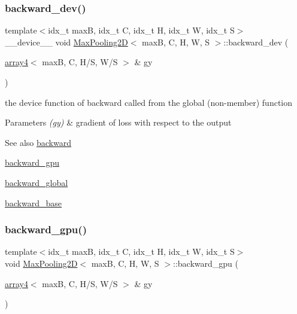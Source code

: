 \subsubsection{\texorpdfstring{backward\+\_\+dev()}{backward\_dev()}}
{\footnotesize\ttfamily template$<$idx\+\_\+t maxB, idx\+\_\+t C, idx\+\_\+t H, idx\+\_\+t W, idx\+\_\+t S$>$ \\
\+\_\+\+\_\+device\+\_\+\+\_\+ void \hyperlink{structMaxPooling2D}{Max\+Pooling2D}$<$ maxB, C, H, W, S $>$\+::backward\+\_\+dev (\begin{DoxyParamCaption}\item[{\hyperlink{structarray4}{array4}$<$ maxB, C, H/S, W/S $>$ \&}]{gy }\end{DoxyParamCaption})\hspace{0.3cm}{\ttfamily [inline]}}



the device function of backward called from the global (non-\/member) function 


\begin{DoxyParams}{Parameters}
{\em (gy)} & gradient of loss with respect to the output \\
\hline
\end{DoxyParams}
\begin{DoxySeeAlso}{See also}
\hyperlink{structMaxPooling2D_ae0ad0f868dcf5f976f4dd99dd91e2f91}{backward} 

\hyperlink{structMaxPooling2D_ae7d3c7c84e64b9060471973b58899315}{backward\+\_\+gpu} 

\hyperlink{softmaxcrossentropy_8h_a47d56a9a23e08247b227f4aac17413e0}{backward\+\_\+global} 

\hyperlink{structMaxPooling2D_a3a2ce37cba46cc7cfd219e55bb3c2f29}{backward\+\_\+base} 
\end{DoxySeeAlso}
\mbox{\label{structMaxPooling2D_ae7d3c7c84e64b9060471973b58899315}} 
\subsubsection{\texorpdfstring{backward\+\_\+gpu()}{backward\_gpu()}}
{\footnotesize\ttfamily template$<$idx\+\_\+t maxB, idx\+\_\+t C, idx\+\_\+t H, idx\+\_\+t W, idx\+\_\+t S$>$ \\
void \hyperlink{structMaxPooling2D}{Max\+Pooling2D}$<$ maxB, C, H, W, S $>$\+::backward\+\_\+gpu (\begin{DoxyParamCaption}\item[{\hyperlink{structarray4}{array4}$<$ maxB, C, H/S, W/S $>$ \&}]{gy }\end{DoxyParamCaption})\hspace{0.3cm}{\ttfamily [inline]}}



